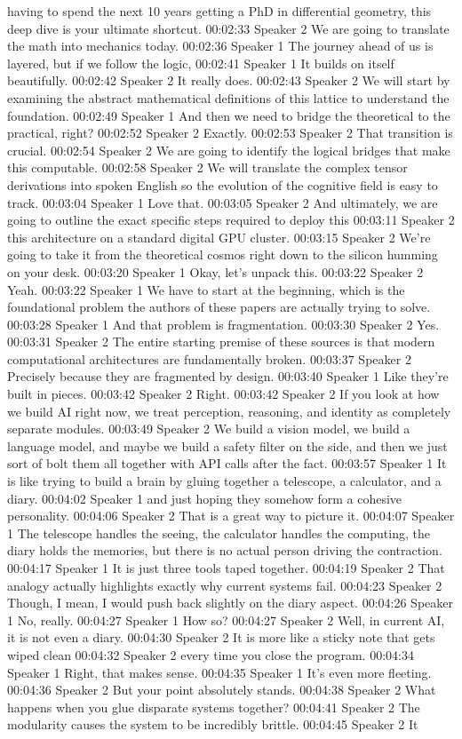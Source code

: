 having to spend the next 10 years getting a PhD in differential geometry, this deep dive is your ultimate shortcut. 00:02:33 Speaker 2 We are going to translate the math into mechanics today. 00:02:36 Speaker 1 The journey ahead of us is layered, but if we follow the logic, 00:02:41 Speaker 1 It builds on itself beautifully. 00:02:42 Speaker 2 It really does. 00:02:43 Speaker 2 We will start by examining the abstract mathematical definitions of this lattice to understand the foundation. 00:02:49 Speaker 1 And then we need to bridge the theoretical to the practical, right? 00:02:52 Speaker 2 Exactly. 00:02:53 Speaker 2 That transition is crucial. 00:02:54 Speaker 2 We are going to identify the logical bridges that make this computable. 00:02:58 Speaker 2 We will translate the complex tensor derivations into spoken English so the evolution of the cognitive field is easy to track. 00:03:04 Speaker 1 Love that. 00:03:05 Speaker 2 And ultimately, we are going to outline the exact specific steps required to deploy this 00:03:11 Speaker 2 this architecture on a standard digital GPU cluster. 00:03:15 Speaker 2 We're going to take it from the theoretical cosmos right down to the silicon humming on your desk. 00:03:20 Speaker 1 Okay, let's unpack this. 00:03:22 Speaker 2 Yeah. 00:03:22 Speaker 1 We have to start at the beginning, which is the foundational problem the authors of these papers are actually trying to solve. 00:03:28 Speaker 1 And that problem is fragmentation. 00:03:30 Speaker 2 Yes. 00:03:31 Speaker 2 The entire starting premise of these sources is that modern computational architectures are fundamentally broken. 00:03:37 Speaker 2 Precisely because they are fragmented by design. 00:03:40 Speaker 1 Like they're built in pieces. 00:03:42 Speaker 2 Right. 00:03:42 Speaker 2 If you look at how we build AI right now, we treat perception, reasoning, and identity as completely separate modules. 00:03:49 Speaker 2 We build a vision model, we build a language model, and maybe we build a safety filter on the side, and then we just sort of bolt them all together with API calls after the fact. 00:03:57 Speaker 1 It is like trying to build a brain by gluing together a telescope, a calculator, and a diary. 00:04:02 Speaker 1 and just hoping they somehow form a cohesive personality. 00:04:06 Speaker 2 That is a great way to picture it. 00:04:07 Speaker 1 The telescope handles the seeing, the calculator handles the computing, the diary holds the memories, but there is no actual person driving the contraction. 00:04:17 Speaker 1 It is just three tools taped together. 00:04:19 Speaker 2 That analogy actually highlights exactly why current systems fail. 00:04:23 Speaker 2 Though, I mean, I would push back slightly on the diary aspect. 00:04:26 Speaker 1 No, really. 00:04:27 Speaker 1 How so? 00:04:27 Speaker 2 Well, in current AI, it is not even a diary. 00:04:30 Speaker 2 It is more like a sticky note that gets wiped clean 00:04:32 Speaker 2 every time you close the program. 00:04:34 Speaker 1 Right, that makes sense. 00:04:35 Speaker 1 It's even more fleeting. 00:04:36 Speaker 2 But your point absolutely stands. 00:04:38 Speaker 2 What happens when you glue disparate systems together? 00:04:41 Speaker 2 The modularity causes the system to be incredibly brittle. 00:04:45 Speaker 2 It 